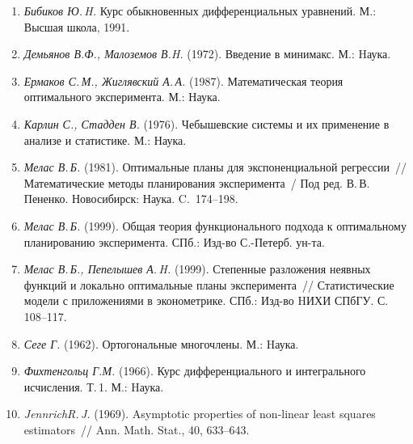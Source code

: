 
\newpage
\centerline{} \vskip2.5cm

 \vskip1.5cm
\begin{enumerate}
\item {\it Бибиков Ю.\,H.} Курс обыкновенных дифференциальных
уравнений.  М.: Высшая школа, 1991.

\item {\it Демьянов В.Ф., Малоземов В.H.} (1972). Введение в
минимакс. М.: Hаука.


\item {\it Ермаков С.\,М., Жиглявский А.\,А.} (1987).  Математическая теория
оптимального эксперимента. М.: Наука.

\item{\it Карлин С., Стадден В.} (1976). Чебышевские системы и их при\-ме\-не\-ние
в анализе и статистике. М.: Наука.


\item {\it Мелас В.\,Б.} (1981). Оптимальные планы для экспоненциальной
регрессии~// Математические методы планирования эксперимента~/ Под
ред. В.\,В.\,Пененко. Новосибирск: Наука. C.~174--198.

\item {\it Мелас В.\,Б.} (1999). Общая теория функционального подхода к оптимальному
планированию эксперимента. СПб.: Изд-во С.-Петерб. ун-та.

\item {\it Мелас В.\,Б., Пепелышев А.\,H.} (1999). Степенные
разложения неявных функций и локально оптимальные планы
эксперимента~// Статистические модели с приложениями в эконометрике.
СПб.: Изд-во HИХИ СПбГУ. С.\,108--117.

\item {\it Сеге Г.} (1962). Ортогональные многочлены. М.: Hаука.

\item {\it Фихтенгольц Г.М.} (1966). Курс дифференциального и
интегрального исчисления. Т.\,1. М.: Hаука.

\item {\it JennrichR.\,J.} (1969). Asymptotic properties of non-linear
least squares estimators~// Ann. Math. Stat., 40, 633--643.
\end{enumerate}
